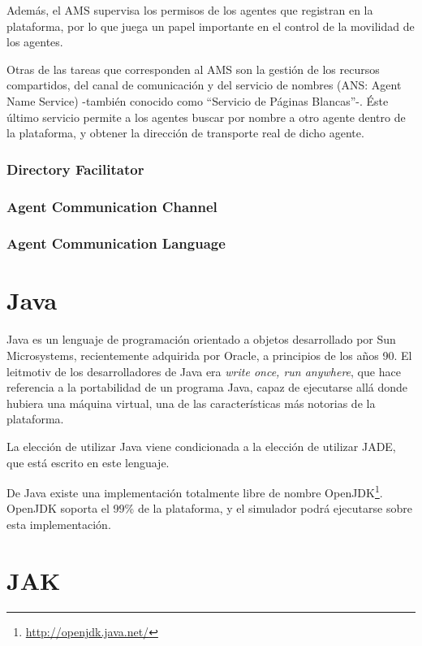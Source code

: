 Además, el AMS supervisa los permisos de los agentes que registran en la
plataforma, por lo que juega un papel importante en el control de la movilidad
de los agentes.

Otras de las tareas que corresponden al AMS son la gestión de los recursos
compartidos, del canal de comunicación y del servicio de nombres (ANS: Agent
Name Service) -también conocido como ``Servicio de Páginas Blancas''-. Éste
último servicio permite a los agentes buscar por nombre a otro agente dentro de
la plataforma, y obtener la dirección de transporte real de dicho agente.

\subsubsection*{Directory Facilitator}

\subsubsection*{Agent Communication Channel}

\subsubsection*{Agent Communication Language}

\section*{Java}

Java es un lenguaje de programación orientado a objetos desarrollado por Sun
Microsystems, recientemente adquirida por Oracle, a principios de los años 90.
El leitmotiv de los desarrolladores de Java era {\em write once, run anywhere},
que hace referencia a la portabilidad de un programa Java, capaz de ejecutarse
allá donde hubiera una máquina virtual, una de las características más notorias
de la plataforma.

La elección de utilizar Java viene condicionada a la elección de utilizar JADE,
que está escrito en este lenguaje.

De Java existe una implementación totalmente libre de nombre
OpenJDK\footnote{\url{http://openjdk.java.net/}}. OpenJDK soporta el 99\% de la
plataforma, y el simulador podrá ejecutarse sobre esta implementación.

\section*{JAK}

